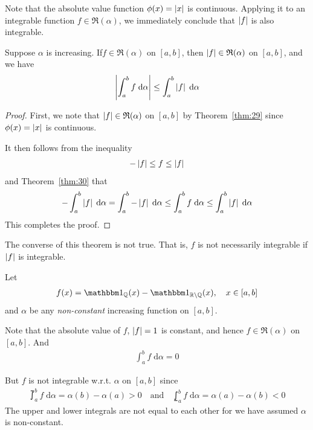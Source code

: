 \documentclass[thmcnt=section, 12pt]{my-elegantbook}
\begin{document}

Note that the absolute value function $\phi(x) = \left\lvert x \right\rvert$ is continuous. Applying it to an integrable function $f \in \mathfrak{R}(\alpha)$, we immediately conclude that $\left\lvert f \right\rvert$ is also integrable.

\begin{theorem} \label{thm:31}
    Suppose $\alpha$ is increasing. If$f \in \mathfrak{R}(\alpha)$ on $[a, b]$, then $\left\lvert f \right\rvert \in \mathfrak{R}(\alpha)$ on $[a, b]$, and we have 
    \begin{align}
        \left\lvert \int_{a}^{b} f \; \mathrm{d}\alpha \right\rvert
        \leq \int_{a}^{b} \left\lvert f \right\rvert \; \mathrm{d}\alpha
        \label{eq:76}
    \end{align}
\end{theorem}

\begin{proof}
    First, we note that $\left\lvert f \right\rvert \in \mathfrak{R}(\alpha)$ on $[a, b]$ by Theorem~\ref{thm:29} since $\phi(x) = \left\lvert x \right\rvert$ is continuous.

    It then follows from the inequality
    \begin{align*}
        -\left\lvert f \right\rvert \leq f \leq \left\lvert f \right\rvert
    \end{align*}
    and Theorem~\ref{thm:30} that 
    \begin{align*}
        -\int_{a}^{b} \left\lvert f \right\rvert \; \mathrm{d}\alpha
        = \int_{a}^{b} -\left\lvert f \right\rvert \; \mathrm{d}\alpha
        \leq \int_{a}^{b} f \; \mathrm{d}\alpha
        \leq \int_{a}^{b} \left\lvert f \right\rvert \; \mathrm{d}\alpha
    \end{align*}
    This completes the proof.
\end{proof}

The converse of this theorem is not true. That is, $f$ is not necessarily integrable if $\left\lvert f \right\rvert$ is integrable.

\begin{example}
    Let 
    \begin{align*}
        f(x) = \ind_{\Q}(x) - \ind_{\R \setminus \Q}(x),
        \quad x \in [a, b]
    \end{align*}
    and $\alpha$ be any \textit{non-constant} increasing function on $[a, b]$.
    
    Note that the absolute value of $f$, $\left\lvert f \right\rvert = 1$ is constant, and hence $f \in \mathfrak{R}(\alpha)$ on $[a, b]$. And 
    \begin{align*}
        \int_{a}^{b} f \; \mathrm{d}\alpha = 0
    \end{align*}

    But $f$ is not integrable w.r.t. $\alpha$ on $[a,b]$ since 
    \begin{align*}
        \upint_a^b f \; \mathrm{d}\alpha = \alpha(b) - \alpha(a) > 0
        \quad \text{and} \quad 
        \lowint_a^b f \; \mathrm{d}\alpha = \alpha(a) - \alpha(b) < 0
    \end{align*}
    The upper and lower integrals are not equal to each other for we have assumed $\alpha$ is non-constant.
\end{example}
\end{document}
